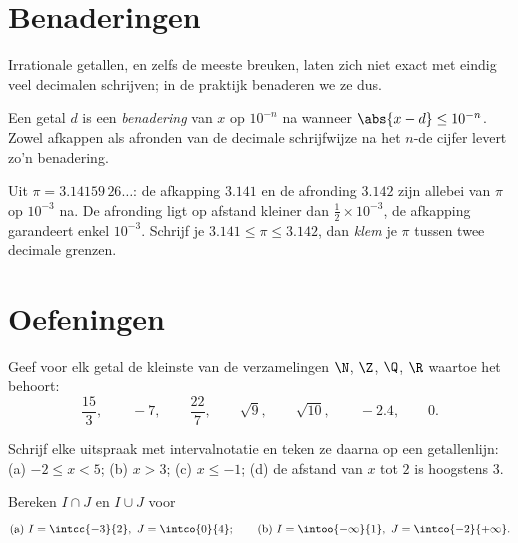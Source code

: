 \section{Benaderingen}

Irrationale getallen, en zelfs de meeste breuken, laten zich niet exact met
eindig veel decimalen schrijven; in de praktijk benaderen we ze dus.

\begin{definition}\label{def:g10:numbers:approx}
Een getal $d$ is een \emph{benadering} van $x$ op
$10^{-n}$ na wanneer $\abs{x - d} \leq 10^{-n}$. Zowel afkappen als afronden
van de decimale schrijfwijze na het $n$-de cijfer levert zo'n benadering.
\end{definition}

\begin{example}
Uit $\pi = 3.14159\,26\dots$: de afkapping $3.141$ en de afronding $3.142$
zijn allebei  van $\pi$ op $10^{-3}$ na. De afronding ligt op
afstand kleiner dan $\frac12 \times 10^{-3}$, de afkapping garandeert enkel
$10^{-3}$. Schrijf je $3.141 \leq \pi \leq 3.142$, dan \emph{klem} je $\pi$
tussen twee decimale grenzen.
\end{example}

\section{Oefeningen}

\begin{exercise}[$\star$]\label{exo:g10:numbers:1}
Geef voor elk getal de kleinste van de verzamelingen $\N$, $\Z$, $\Q$, $\R$
waartoe het behoort:
\[
\frac{15}{3}, \qquad -7, \qquad \frac{22}{7}, \qquad \sqrt{9}, \qquad
\sqrt{10}, \qquad -2.4, \qquad 0 .
\]
\end{exercise}

\begin{exercise}[$\star$]\label{exo:g10:numbers:2}
Schrijf elke uitspraak met intervalnotatie en teken ze daarna op een
getallenlijn: (a) $-2 \leq x < 5$; (b) $x > 3$; (c) $x \leq -1$; (d) de
afstand van $x$ tot $2$ is hoogstens $3$.
\end{exercise}

\begin{exercise}[$\star$]\label{exo:g10:numbers:3}
Bereken $I \cap J$ en $I \cup J$ voor
\[
\text{(a) } I = \intcc{-3}{2},\ J = \intco{0}{4};
\qquad
\text{(b) } I = \intoo{-\infty}{1},\ J = \intco{-2}{+\infty}.
\]
\end{exercise}


